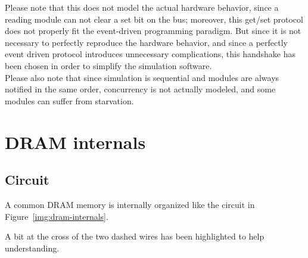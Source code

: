 \documentclass[a4paper,12pt]{article}
\begin{document}
Please note that this does not model the actual hardware behavior, since a reading module can not clear a set bit on the bus;
moreover, this get/set protocol does not properly fit the event-driven programming paradigm.
But since it is not necessary to perfectly reproduce the hardware behavior, and since a perfectly event driven protocol introduces unnecessary complications, this handshake has been chosen in order to simplify the simulation software.\\

Please also note that since simulation is sequential and modules are always notified in the same order, concurrency is not actually modeled, and some modules can suffer from starvation.

\section{DRAM internals}
\subsection{Circuit}
A common DRAM memory is internally organized like the circuit in Figure~\ref{img:dram-internals}.

A bit at the cross of the two dashed wires has been highlighted to help understanding.
\end{document}
